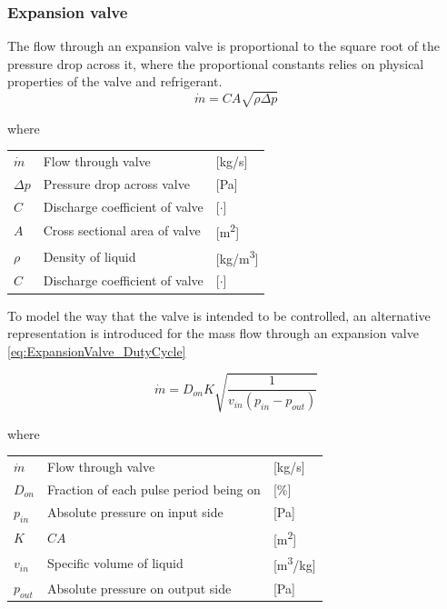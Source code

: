 \subsubsection{Expansion valve}
The flow through an expansion valve is proportional to the square root of the pressure drop across it, where the proportional constants relies on physical properties of the valve and refrigerant.
\begin{equation} \label{eq:ExpansionValve}
	\dot{m}= C A \sqrt{\rho\Delta p}
\end{equation}

where 
\begin{center}
	\begin{tabular}{l p{8cm} l}
		$\dot{m}$ 	& Flow through valve & [\si{kg}/\si{s}]\\ 
		$\Delta p$ 	& Pressure drop across valve & [\si{Pa}]\\
		$C$ 		& Discharge coefficient of valve & [$\cdot$]\\
		$A$	 		& Cross sectional area of valve & [\si{m^2}]\\
		$\rho$ 		& Density of liquid & [\si{kg}/\si{m^3}]\\
			$C$ 	& Discharge coefficient of valve & [$\cdot$]\\
	\end{tabular}
\end{center}

To model the way that the valve is intended to be controlled, an alternative representation is introduced for the mass flow through an expansion valve \cref{eq:ExpansionValve_DutyCycle}

\begin{equation} \label{eq:ExpansionValve_DutyCycle}
	\dot{m}= D_{on} K  \sqrt{\frac{1}{v_{in} (p_{in} - p_{out})}}
\end{equation}

where 
\begin{center}
	\begin{tabular}{l p{8cm} l}
		$\dot{m}$	& Flow through valve & [\si{kg}/\si{s}]\\ 
		$D_{on}$ 	& Fraction of each pulse period being on & [$\%$]\\
		$p_{in}$ 	& Absolute pressure on input side & [\si{Pa}]\\
		$K$ 		& $C A$ & [\si{m^2}]\\
		$v_{in}$ 	& Specific volume of liquid & [\si{m^3}/\si{kg}]\\
		$p_{out}$ 	& Absolute pressure on output side & [\si{Pa}]\\
	\end{tabular}
\end{center}

